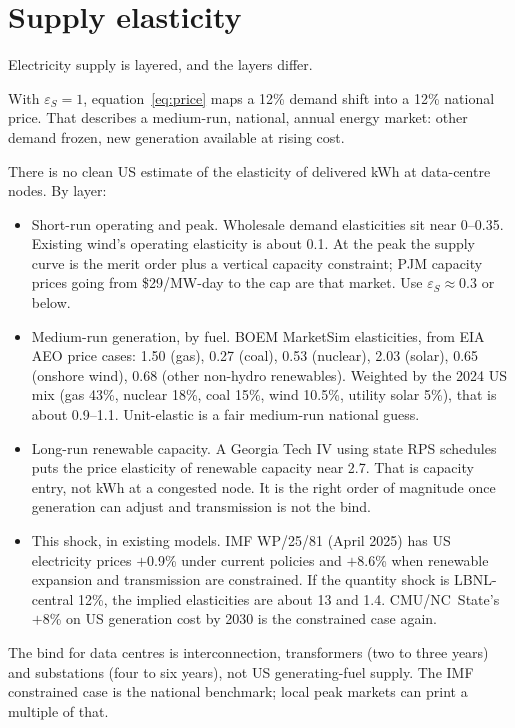 \documentclass[11pt]{article}
\begin{document}
\section{Supply elasticity}
\label{sec:elas}

Electricity supply is layered, and the layers differ.

With $\varepsilon_S=1$, equation~\eqref{eq:price} maps a 12\% demand shift
into a 12\% national price. That describes a medium-run, national, annual
energy market: other demand frozen, new generation available at rising cost.

There is no clean US estimate of the elasticity of delivered kWh at
data-centre nodes. By layer:

\begin{itemize}
\item Short-run operating and peak. Wholesale demand elasticities sit near
0--0.35. Existing wind's operating elasticity is about 0.1. At the peak the
supply curve is the merit order plus a vertical capacity constraint; PJM
capacity prices going from \$29/MW-day to the cap are that market. Use
$\varepsilon_S\approx 0.3$ or below.

\item Medium-run generation, by fuel. BOEM MarketSim elasticities, from EIA
AEO price cases: 1.50 (gas), 0.27 (coal), 0.53 (nuclear), 2.03 (solar),
0.65 (onshore wind), 0.68 (other non-hydro renewables). Weighted by the 2024
US mix (gas 43\%, nuclear 18\%, coal 15\%, wind 10.5\%, utility solar 5\%),
that is about 0.9--1.1. Unit-elastic is a fair medium-run national guess.

\item Long-run renewable capacity. A Georgia Tech IV using state RPS
schedules puts the price elasticity of renewable capacity near 2.7. That is
capacity entry, not kWh at a congested node. It is the right order of
magnitude once generation can adjust and transmission is not the bind.

\item This shock, in existing models. IMF WP/25/81 (April 2025) has US
electricity prices $+$0.9\% under current policies and $+$8.6\% when
renewable expansion and transmission are constrained. If the quantity shock
is LBNL-central 12\%, the implied elasticities are about 13 and 1.4.
CMU/NC~State's $+$8\% on US generation cost by 2030 is the constrained case
again.
\end{itemize}

The bind for data centres is interconnection, transformers (two to three
years) and substations (four to six years), not US generating-fuel supply.
The IMF constrained case is the national benchmark; local peak markets can
print a multiple of that.
\end{document}
